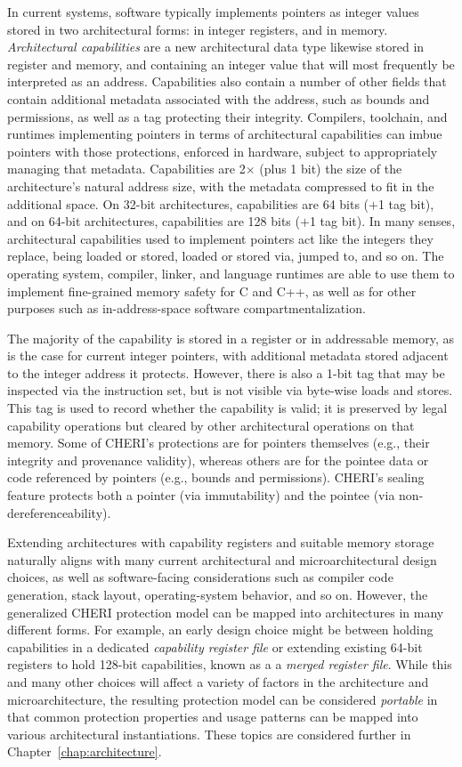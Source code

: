 In current systems, software typically implements pointers as integer values
stored in two architectural forms: in integer registers, and in memory.
\textit{Architectural capabilities} are a new architectural data type likewise
stored in register and memory, and containing an integer value that will most
frequently be interpreted as an address.
Capabilities also contain a number of other fields that contain additional
metadata associated with the address, such as bounds and permissions, as well
as a tag protecting their integrity.
Compilers, toolchain, and runtimes implementing pointers in terms of
architectural capabilities can imbue pointers with those protections, enforced
in hardware, subject to appropriately managing that metadata.
Capabilities are 2$\times$ (plus 1 bit) the size of the architecture's
natural address size, with the metadata compressed to fit in the additional
space.
On 32-bit architectures, capabilities are 64 bits ($+$1 tag bit), and on
64-bit architectures, capabilities are 128 bits ($+$1 tag bit).
In many senses, architectural capabilities used to implement pointers act like
the integers they replace, being loaded or stored, loaded or stored via,
jumped to, and so on.
The operating system, compiler, linker, and language runtimes are able to use
them to implement fine-grained memory safety for C and C++, as well as for
other purposes such as in-address-space software compartmentalization.

The majority of the capability is stored in a register or in
addressable memory, as is the case
for current integer pointers, with additional metadata stored adjacent to the
integer address it protects.
However, there is also a 1-bit tag that may be
inspected via the instruction set, but is not visible via byte-wise loads and
stores.
This tag is used to record whether the capability is valid; it is
preserved by legal capability operations but cleared by other architectural
operations on that memory.
%
Some of CHERI's protections are for pointers themselves (e.g., their integrity
and provenance validity), whereas others are for the pointee data or code
referenced by pointers (e.g., bounds and permissions).
CHERI's sealing feature protects both a pointer (via immutability) and the
pointee (via non-dereferenceability).

Extending architectures with capability registers and suitable memory storage
naturally aligns with many current architectural and microarchitectural design
choices, as well as software-facing considerations such as compiler code
generation, stack layout, operating-system behavior, and so on.
However, the generalized CHERI protection model can be mapped into
architectures in many different forms.
For example, an early design choice might be between holding capabilities in
a dedicated \textit{capability register file} or extending existing 64-bit
registers to hold 128-bit capabilities, known as a a \textit{merged
register file}.
While this and many other choices will affect a variety of factors in the
architecture and microarchitecture, the resulting protection model can be
considered \textit{portable} in that common protection properties and usage
patterns can be mapped into various architectural instantiations.
These topics are considered further in Chapter~\ref{chap:architecture}.

